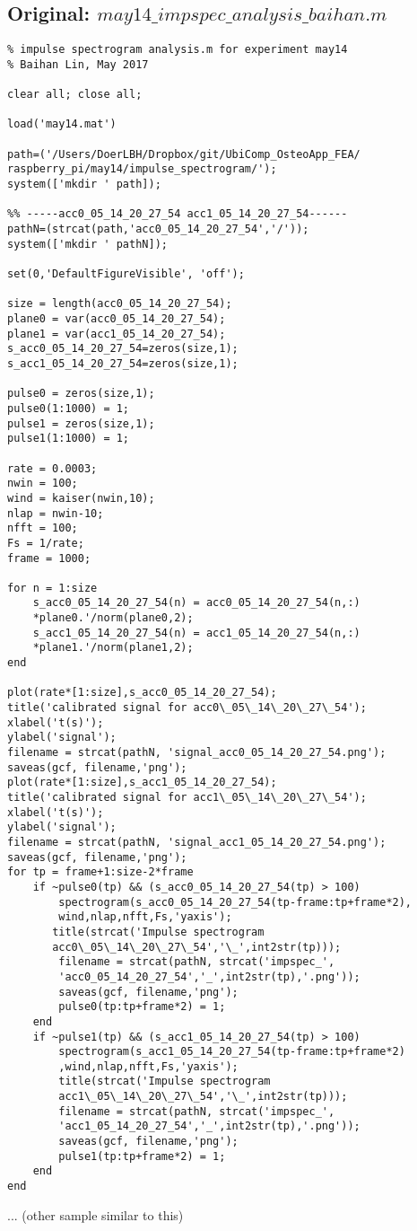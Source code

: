 \documentclass{sigchi}
\begin{document}
\subsection{Original: $may14\_impspec\_analysis\_baihan.m$}\label{ss:impspc_ana.m}
\begin{lstlisting}
% impulse spectrogram analysis.m for experiment may14 
% Baihan Lin, May 2017

clear all; close all;

load('may14.mat')

path=('/Users/DoerLBH/Dropbox/git/UbiComp_OsteoApp_FEA/
raspberry_pi/may14/impulse_spectrogram/');
system(['mkdir ' path]);

%% -----acc0_05_14_20_27_54 acc1_05_14_20_27_54------
pathN=(strcat(path,'acc0_05_14_20_27_54','/'));
system(['mkdir ' pathN]);

set(0,'DefaultFigureVisible', 'off');

size = length(acc0_05_14_20_27_54);
plane0 = var(acc0_05_14_20_27_54);
plane1 = var(acc1_05_14_20_27_54);
s_acc0_05_14_20_27_54=zeros(size,1);
s_acc1_05_14_20_27_54=zeros(size,1);

pulse0 = zeros(size,1);
pulse0(1:1000) = 1;
pulse1 = zeros(size,1);
pulse1(1:1000) = 1;

rate = 0.0003;
nwin = 100;
wind = kaiser(nwin,10);
nlap = nwin-10;
nfft = 100;
Fs = 1/rate;
frame = 1000;

for n = 1:size
    s_acc0_05_14_20_27_54(n) = acc0_05_14_20_27_54(n,:)
    *plane0.'/norm(plane0,2);
    s_acc1_05_14_20_27_54(n) = acc1_05_14_20_27_54(n,:)
    *plane1.'/norm(plane1,2);
end

plot(rate*[1:size],s_acc0_05_14_20_27_54);
title('calibrated signal for acc0\_05\_14\_20\_27\_54');
xlabel('t(s)');
ylabel('signal');
filename = strcat(pathN, 'signal_acc0_05_14_20_27_54.png');
saveas(gcf, filename,'png');
plot(rate*[1:size],s_acc1_05_14_20_27_54);
title('calibrated signal for acc1\_05\_14\_20\_27\_54');
xlabel('t(s)');
ylabel('signal');
filename = strcat(pathN, 'signal_acc1_05_14_20_27_54.png');
saveas(gcf, filename,'png');
for tp = frame+1:size-2*frame
    if ~pulse0(tp) && (s_acc0_05_14_20_27_54(tp) > 100)
        spectrogram(s_acc0_05_14_20_27_54(tp-frame:tp+frame*2),
        wind,nlap,nfft,Fs,'yaxis');
       title(strcat('Impulse spectrogram 
       acc0\_05\_14\_20\_27\_54','\_',int2str(tp)));
        filename = strcat(pathN, strcat('impspec_',
        'acc0_05_14_20_27_54','_',int2str(tp),'.png'));
        saveas(gcf, filename,'png');
        pulse0(tp:tp+frame*2) = 1;
    end
    if ~pulse1(tp) && (s_acc1_05_14_20_27_54(tp) > 100)
        spectrogram(s_acc1_05_14_20_27_54(tp-frame:tp+frame*2)
        ,wind,nlap,nfft,Fs,'yaxis');
        title(strcat('Impulse spectrogram 
        acc1\_05\_14\_20\_27\_54','\_',int2str(tp)));
        filename = strcat(pathN, strcat('impspec_',
        'acc1_05_14_20_27_54','_',int2str(tp),'.png'));
        saveas(gcf, filename,'png');
        pulse1(tp:tp+frame*2) = 1;
    end
end
\end{lstlisting}
... (other sample similar to this)
\end{document}

